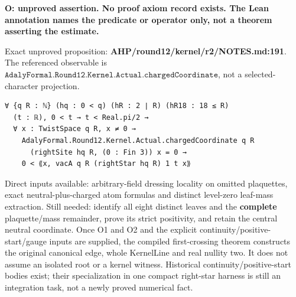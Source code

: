 \begin{theorem}
\label{open-positive}
\textbf{O: unproved assertion. No proof axiom record exists. The Lean annotation names the predicate or operator only, not a theorem asserting the estimate.}

Exact unproved proposition: \textbf{AHP/round12/kernel/r2/NOTES.md:191}. The referenced observable is \(\texttt{AdalyFormal.Round12.Kernel.Actual.chargedCoordinate}\), not a selected-character projection.



\begin{verbatim}
∀ {q R : ℕ} (hq : 0 < q) (hR : 2 ∣ R) (hR18 : 18 ≤ R)
  (t : ℝ), 0 < t → t < Real.pi/2 →
  ∀ x : TwistSpace q R, x ≠ 0 →
    AdalyFormal.Round12.Kernel.Actual.chargedCoordinate q R
      (rightSite hq R, (0 : Fin 3)) x = 0 →
    0 < ⟪x, vacA q R (rightStar hq R) 1 t x⟫
\end{verbatim}


Direct inputs available: arbitrary-field dressing locality on omitted plaquettes, exact neutral-plus-charged atom formulas and distinct level-zero leaf-mass extraction. Still needed: identify all eight distinct leaves and the \textbf{complete} plaquette/mass remainder, prove its strict positivity, and retain the central neutral coordinate. Once O1 and O2 and the explicit continuity/positive-start/gauge inputs are supplied, the compiled first-crossing theorem constructs the original canonical edge, whole KernelLine and real nullity two. It does not assume an isolated root or a kernel witness. Historical continuity/positive-start bodies exist; their specialization in one compact right-star harness is still an integration task, not a newly proved numerical fact.


\end{theorem}


